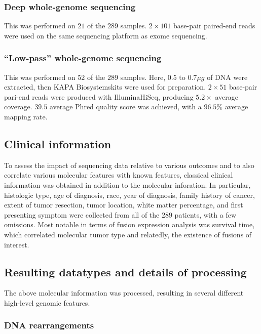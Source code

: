 \subsubsection{Deep whole-genome sequencing}
This was performed on $21$ of the $289$ samples. $2 \times 101$
base-pair paired-end reads were used on the same sequencing platform
as exome sequencing.

\subsubsection{``Low-pass'' whole-genome sequencing}

This was performed on $52$ of the $289$ samples. Here, $0.5$ to
$0.7\mu g$ of DNA were extracted, then KAPA Biosystems\reg kits were
used for preparation. $2 \times 51$ base-pair pari-end reads were
produced with Illumina\reg HiSeq\tm, producing $5.2 \times$ average
coverage. $39.5$ average Phred quality score was achieved, with a
$96.5\%$ average mapping rate.

\subsection{Clinical information}

To assess the impact of sequencing data relative to various
outcomes and to also correlate various molecular features with known
features, classical clinical information was obtained in addition to
the molecular inforation. In particular, histologic type, age of
diagnosis, race, year of diagnosis, family history of cancer, extent
of tumor resection, tumor location, white matter percentage, and first
presenting symptom were collected from all of the $289$ patients, with
a few omissions. Most notable in terms of fusion expression analysis
was survival time, which correlated molecular tumor type and
relatedly, the existence of fusions of interest.

\subsection{Resulting datatypes and details of processing}

The above molecular information was processed, resulting in several
different high-level genomic features.

\subsubsection{DNA rearrangements}

